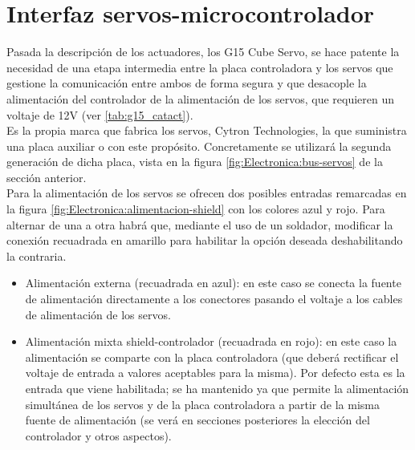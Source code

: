 \section{Interfaz servos-microcontrolador} \label{sec:Electronica:Potencia}

	Pasada la descripción de los actuadores, los G15 Cube Servo, se hace patente la necesidad de una etapa intermedia entre la placa controladora y los servos que gestione la comunicación entre ambos de forma segura y que desacople la alimentación del controlador de la alimentación de los servos, que requieren un voltaje de 12V (ver \ref{tab:g15_catact}).
	\\
	
	Es la propia marca que fabrica los servos, Cytron Technologies, la que suministra una placa auxiliar o  con este propósito. Concretamente se utilizará la segunda generación de dicha placa, vista en la figura \ref{fig:Electronica:bus-servos} de la sección anterior.
	\\
	
	Para la alimentación de los servos se ofrecen dos posibles entradas remarcadas en la figura \ref{fig:Electronica:alimentacion-shield} con los colores azul y rojo. Para alternar de una a otra habrá que, mediante el uso de un soldador, modificar la conexión recuadrada en amarillo para habilitar la opción deseada deshabilitando la contraria.
	\begin{itemize}
		\item Alimentación externa (recuadrada en azul): en este caso se conecta la fuente de alimentación directamente a los conectores pasando el voltaje a los cables de alimentación de los servos.
		\item Alimentación mixta shield-controlador (recuadrada en rojo): en este caso la alimentación se comparte con la placa controladora (que deberá rectificar el voltaje de entrada a valores aceptables para la misma). Por defecto esta es la entrada que viene habilitada; se ha mantenido ya que permite la alimentación simultánea de los servos y de la placa controladora a partir de la misma fuente de alimentación (se verá en secciones posteriores la elección del controlador y otros aspectos). 
	\end{itemize}
		
